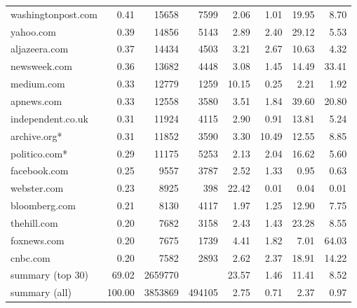 \begin{tabular}{lrrrrrrr}
washingtonpost.com  &    0.41 &    15658 &    7599 &         2.06 &         1.01 &         19.95 &          8.70 \\
yahoo.com           &    0.39 &    14856 &    5143 &         2.89 &         2.40 &         29.12 &          5.53 \\
aljazeera.com       &    0.37 &    14434 &    4503 &         3.21 &         2.67 &         10.63 &          4.32 \\
newsweek.com        &    0.36 &    13682 &    4448 &         3.08 &         1.45 &         14.49 &         33.41 \\
medium.com          &    0.33 &    12779 &    1259 &        10.15 &         0.25 &          2.21 &          1.92 \\
apnews.com          &    0.33 &    12558 &    3580 &         3.51 &         1.84 &         39.60 &         20.80 \\
independent.co.uk   &    0.31 &    11924 &    4115 &         2.90 &         0.91 &         13.81 &          5.24 \\
archive.org*        &    0.31 &    11852 &    3590 &         3.30 &        10.49 &         12.55 &          8.85 \\
politico.com*       &    0.29 &    11175 &    5253 &         2.13 &         2.04 &         16.62 &          5.60 \\
facebook.com        &    0.25 &     9557 &    3787 &         2.52 &         1.33 &          0.95 &          0.63 \\
webster.com         &    0.23 &     8925 &     398 &        22.42 &         0.01 &          0.04 &          0.01 \\
bloomberg.com       &    0.21 &     8130 &    4117 &         1.97 &         1.25 &         12.90 &          7.75 \\
thehill.com         &    0.20 &     7682 &    3158 &         2.43 &         1.43 &         23.28 &          8.55 \\
foxnews.com         &    0.20 &     7675 &    1739 &         4.41 &         1.82 &          7.01 &         64.03 \\
cnbc.com            &    0.20 &     7582 &    2893 &         2.62 &         2.37 &         18.91 &         14.22 \\
summary (top 30)    &   69.02 &  2659770 &         &        23.57 &         1.46 &         11.41 &          8.52 \\
summary (all)       &  100.00 &  3853869 &  494105 &         2.75 &         0.71 &          2.37 &          0.97 \\
\bottomrule
\end{tabular}
